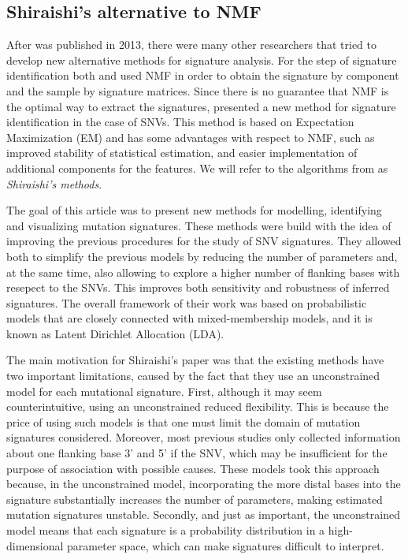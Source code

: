 \documentclass[a4paper]{article}
\begin{document}
\subsection{Shiraishi's alternative to NMF}
After \cite{Alex} was published in 2013, there were many other researchers that tried to develop new alternative methods for signature analysis. For the step of signature identification both \cite{Alex} and \cite{Geoff} used NMF in order to obtain the signature by component and the sample by signature matrices. Since there is no guarantee that NMF is the optimal way to  extract the signatures, \cite{Shira} presented a new method for signature identification in the case of SNVs. This method is based on Expectation Maximization (EM) and has some advantages with respect to NMF, such as improved stability of statistical estimation, and easier implementation of additional components for the features. We will refer to the algorithms from \cite{Shira} as \textit{Shiraishi's methods}.

The goal of this article was to present new methods for modelling, identifying and visualizing mutation signatures. These methods were build with the idea of improving the previous procedures for the study of SNV signatures. They allowed both to simplify the previous models by reducing the number of parameters and, at the same time, also allowing to explore a higher number of flanking bases with resepect to the SNVs. This improves both sensitivity and robustness of inferred signatures. The overall framework of their work was based on probabilistic models that are closely connected with mixed-membership models, and it is known as Latent Dirichlet Allocation (LDA). 

The main motivation for Shiraishi's paper was that the existing methods have two important limitations, caused by the fact that they use an unconstrained model for each mutational signature. First, although it may seem counterintuitive, using an unconstrained reduced flexibility. This is because the price of using such models is that one must limit the domain of mutation signatures considered. Moreover, most previous studies only collected information about one flanking base 3' and 5' if the SNV, which may be insufficient for the purpose of association with possible causes. These models took this approach because, in the unconstrained model, incorporating the more distal bases into the signature substantially increases the number of parameters, making estimated mutation signatures unstable. Secondly, and just as important, the unconstrained model means that each signature is a probability distribution in a high-dimensional parameter space, which can make signatures difficult to interpret.
\end{document}
